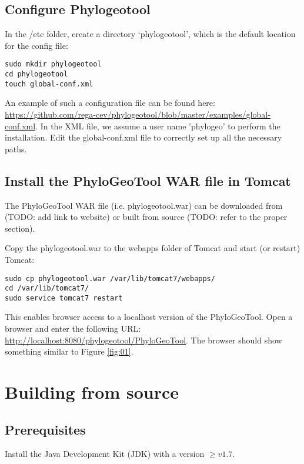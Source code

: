 \documentclass[a4paper, 11pt]{article} %
\begin{document}
\subsection{Configure Phylogeotool} \label{sssec:config_file}

In the /etc folder, create a directory `phylogeotool', which is the default location for the config file:
\begin{verbatim}
sudo mkdir phylogeotool
cd phylogeotool
touch global-conf.xml
\end{verbatim}

An example of such a configuration file can be found here: \url{https://github.com/rega-cev/phylogeotool/blob/master/examples/global-conf.xml}.
In the XML file, we assume a user name 'phylogeo' to perform the installation.
Edit the global-conf.xml file to correctly set up all the necessary paths.

\subsection{Install the PhyloGeoTool WAR file in Tomcat}
The PhyloGeoTool WAR file (i.e. phylogeotool.war) can be downloaded from (TODO: add link to website) or built from source (TODO: refer to the proper section). 

Copy the phylogeotool.war to the webapps folder of Tomcat and start (or restart) Tomcat:
\begin{verbatim}
sudo cp phylogeotool.war /var/lib/tomcat7/webapps/
cd /var/lib/tomcat7/
sudo service tomcat7 restart
\end{verbatim}
This enables browser access to a localhost version of the PhyloGeoTool.
Open a browser and enter the following URL: \url{http://localhost:8080/phylogeotool/PhyloGeoTool}.
The browser should show something similar to Figure \ref{fig:01}.

\section{Building from source}

\subsection{Prerequisites}
Install the Java Development Kit (JDK) with a version $\geq v 1.7$.
\end{document}
